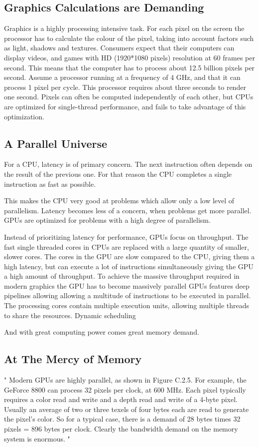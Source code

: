 \documentclass[../main/report.tex]{subfiles}
\begin{document}
\subsection{Graphics Calculations are Demanding}

Graphics is a highly processing intensive task. 
For each pixel on the screen the processor has to calculate the colour of the pixel, taking into account factors such as light, shadows and textures.
Consumers expect that their computers can display videos, and games with HD (1920*1080 pixels) resolution at 60 frames per second.
This means that the computer has to process about 12.5 billion pixels per second.
Assume a processor running at a frequency of 4 GHz, and that it can process 1 pixel per cycle.
This processor requires about three seconds to render one second.
Pixels can often be computed independently of each other, but CPUs are optimized for single-thread performance, and fails to take advantage of this optimization.

\subsection{A Parallel Universe}

For a CPU, latency is of primary concern.
The next instruction often depends on the result of the previous one.
For that reason the CPU completes a single instruction as fast as possible.

This makes the CPU very good at problems which allow only a low level of parallelism.
Latency becomes less of a concern, when problems get more parallel.
GPUs are optimized for problems with a high degree of parallelism.

Instead of prioritizing latency for performance, GPUs focus on throughput.
The fast single threaded cores in CPUs are replaced with a large quantity of smaller, slower cores.
The cores in the GPU are slow compared to the CPU, giving them a high latency, but can execute a lot of instructions simultaneously giving the GPU a high amount of throughput.
To achieve the massive throughput required in modern graphics the GPU has to become massively parallel 
GPUs features deep pipelines allowing allowing a multitude of instructions to be executed in parallel.
The processing cores contain multiple execution units, allowing multiple threads to share the resources.
Dynamic scheduling  

 
And with great computing power comes great memory demand.

\subsection{At The Mercy of Memory}
"
Modern GPUs are highly parallel, as shown in Figure C.2.5. For example, the GeForce 8800 can process 32 pixels per clock, at 600 MHz. Each pixel typically requires a color read and write and a depth read and write of a 4-byte pixel. Usually an average of two or three texels of four bytes each are read to generate the pixel’s color. So for a typical case, there is a demand of 28 bytes times 32 pixels = 896 bytes per clock. Clearly the bandwidth demand on the memory system is enormous.
"
\end{document}
